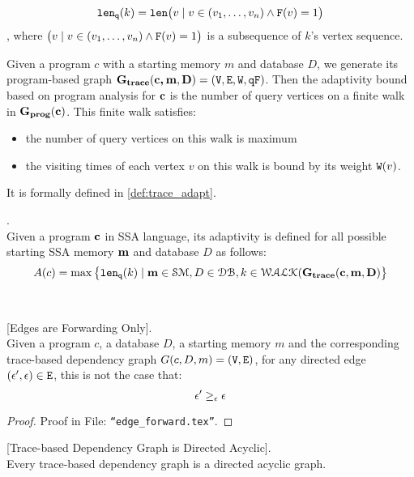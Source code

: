 {\begin{defn}
\[
  \mathtt{len}_{\tt q}(k) = \mathtt{len}\big(
  v \mid v \in (v_1, \ldots, v_{n}) \land \mathtt{F}(v) = 1 \big)
\]
, where $\big(v \mid v \in (v_1, \ldots, v_{n}) \land \mathtt{F}(v) = 1 \big)$ is a subsequence of $k$'s vertex sequence.
\end{defn}
%
Given a program $c$ with a starting memory $m$ and database $D$, we generate its program-based graph 
$\bf{G_{trace}}({\boldsymbol{\mathbf{c, m}}}, D) = (\mathtt{V}, \mathtt{E}, \mathtt{W}, \mathtt{qF})$.
%
Then the adaptivity bound based on program analysis for ${\boldsymbol{\mathbf{c}}}$ is the number of query vertices on a finite walk in $\mathtt{\bf{G_{prog}}}({\boldsymbol{\mathbf{c}}})$. This finite walk satisfies:
%
\begin{itemize}
\item the number of query vertices on this walk is maximum
\item the visiting times of each vertex $v$ on this walk is bound by its weight $\mathtt{W}(v)$.
\end{itemize}
%
It is formally defined in \ref{def:trace_adapt}.
%
\begin{defn}
.
\label{def:trace_adapt}
\\
Given a program ${\boldsymbol{\mathbf{c}}}$ in SSA language, 
its adaptivity is defined for all possible starting SSA memory ${\boldsymbol{\mathbf{m}}}$ and database $D$ as follows:
%
$$
A(c) = \max \big 
\{ \mathtt{len}_{\tt q}(k) \mid {\boldsymbol{\mathbf{m}}} \in \mathcal{SM},D \in \mathcal{DB} , k \in \mathcal{WALK}(\bf{G_{trace}}(c, m, D) \big \} 
$$
\end{defn}
}
\\
%
%
%
%
\begin{lem}
\label{lem:edgeforwarding}
[Edges are Forwarding Only].
\\
%
Given a program $c$, a database $D$, a starting memory $m$ and the corresponding trace-based dependency graph $G(c,D,m) = (\mathtt{V}, \mathtt{E})$, 
for any directed edge $(\mathtt{\epsilon}', \mathtt{\epsilon}) \in \mathtt{E}$, 
this is not the case that:
%
$$\mathtt{\epsilon}' \geq_{\mathtt{\epsilon}} \mathtt{\epsilon}$$
%
\end{lem}
%
\begin{proof}
Proof in File: {\tt ``edge\_forward.tex''}.
% 
\end{proof}
%
%
%
\begin{lem}
\label{lem:DAG}
[Trace-based Dependency Graph is Directed Acyclic].
\\
%
{
Every trace-based dependency graph is a directed acyclic graph.
}
\end{lem}
